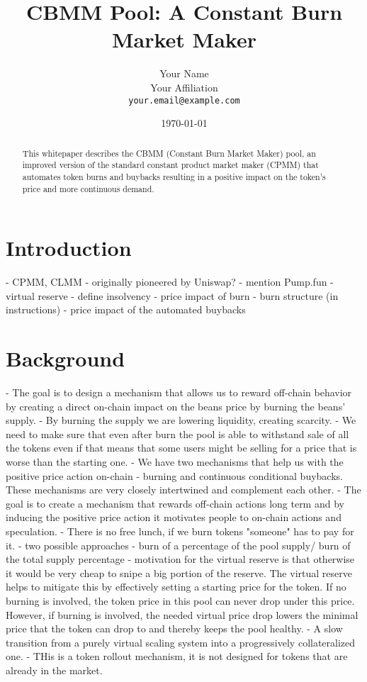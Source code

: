 \documentclass[11pt,a4paper]{article}
\title{CBMM Pool: A Constant Burn Market Maker}
\author{Your Name\\
        Your Affiliation\\
        \texttt{your.email@example.com}}
\date{\today}
\theoremstyle{definition}
\begin{document}
\maketitle

\begin{abstract}
This whitepaper describes the CBMM (Constant Burn Market Maker) pool, an improved version of the standard constant product market maker (CPMM) that automates token burns and buybacks resulting in a positive impact on the token's price and more continuous demand.
\end{abstract}

\tableofcontents
\newpage


\section{Introduction}

- CPMM, CLMM
- originally pioneered by Uniswap?
- mention Pump.fun
- virtual reserve
- define insolvency
- price impact of burn
- burn structure (in instructions)
- price impact of the automated buybacks


\section{Background}

- The goal is to design a mechanism that allows us to reward off-chain behavior by creating a direct on-chain impact on the beans price by burning the beans' supply.
- By burning the supply we are lowering liquidity, creating scarcity.
- We need to make sure that even after burn the pool is able to withstand sale of all the tokens even if that means that some users might be selling for a price that is worse than the starting one.
- We have two mechanisms that help us with the positive price action on-chain - burning and continuous conditional buybacks. These mechanisms are very closely intertwined and complement each other.
- The goal is to create a mechanism that rewards off-chain actions long term and by inducing the positive price action it motivates people to on-chain actions and speculation.
- There is no free lunch, if we burn tokens "someone" has to pay for it.
- two possible approaches - burn of a percentage of the pool supply/ burn of the total supply percentage
- motivation for the virtual reserve is that otherwise it would be very cheap to snipe a big portion of the reserve. The virtual reserve helps to mitigate this by effectively setting a starting price for the token. If no burning is involved, the token price in this pool can never drop under this price. However, if burning is involved, the needed virtual price drop lowers the minimal price that the token can drop to and thereby keeps the pool healthy.
- A slow transition from a purely virtual scaling system into a progressively collateralized one.
- THis is a token rollout mechanism, it is not designed for tokens that are already in the market.
\end{document}
